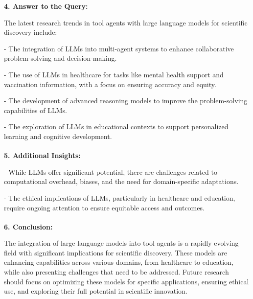 \begin{answerbox}
\textbf{4. Answer to the Query:}

The latest research trends in tool agents with large language models for scientific discovery include:

\quad - The integration of LLMs into multi-agent systems to enhance collaborative problem-solving and decision-making.

\quad - The use of LLMs in healthcare for tasks like mental health support and vaccination information, with a focus on ensuring accuracy and equity.

\quad - The development of advanced reasoning models to improve the problem-solving capabilities of LLMs.

\quad - The exploration of LLMs in educational contexts to support personalized learning and cognitive development.
\\\\
\textbf{ 5. Additional Insights:}

\quad - While LLMs offer significant potential, there are challenges related to computational overhead, biases, and the need for domain-specific adaptations.

\quad - The ethical implications of LLMs, particularly in healthcare and education, require ongoing attention to ensure equitable access and outcomes.
\\\\
\textbf{6. Conclusion:}

The integration of large language models into tool agents is a rapidly evolving field with significant implications for scientific discovery. These models are enhancing capabilities across various domains, from healthcare to education, while also presenting challenges that need to be addressed. Future research should focus on optimizing these models for specific applications, ensuring ethical use, and exploring their full potential in scientific innovation.
\end{answerbox}
